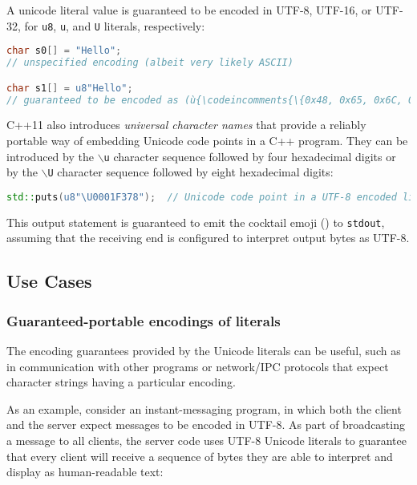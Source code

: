 \noindent A unicode literal value is guaranteed to be encoded in UTF-8, UTF-16, or
UTF-32, for \texttt{u8}, \texttt{u}, and \texttt{U} literals,
respectively:

\begin{lstlisting}[language=C++]
char s0[] = "Hello";
// unspecified encoding (albeit very likely ASCII)

char s1[] = u8"Hello";
// guaranteed to be encoded as (ù{\codeincomments{\{0x48, 0x65, 0x6C, 0x6C, 0x6F, 0x0\}}}ù)
\end{lstlisting}

\noindent C++11 also introduces \emph{universal character names} that provide a
reliably portable way of embedding Unicode code points in a C++ program.
They can be introduced by the \texttt{$\backslash$u} character
sequence followed by four hexadecimal digits or by the
\texttt{$\backslash$U} character sequence followed by eight
hexadecimal digits:

\begin{lstlisting}[language=C++]
std::puts(u8"\U0001F378");  // Unicode code point in a UTF-8 encoded literal
\end{lstlisting}

\noindent This output statement is guaranteed to emit the cocktail emoji
(\martini) to \texttt{stdout}, assuming that the receiving end is configured to
interpret output bytes as UTF-8.

\subsection[Use Cases]{Use Cases}\label{use-cases}

\subsubsection[Guaranteed-portable encodings of literals]{Guaranteed-portable encodings of literals}\label{guaranteed-portable-encodings-of-literals}

The encoding guarantees provided by the Unicode literals can be useful,
such as in communication with other programs or network/IPC protocols that
expect character strings having a particular encoding.

As an example, consider an instant-messaging program, in which both the
client and the server expect messages to be encoded in UTF-8. As part of
broadcasting a message to all clients, the server code uses UTF-8
Unicode literals to guarantee that every client will receive a sequence
of bytes they are able to interpret and display as human-readable text:

